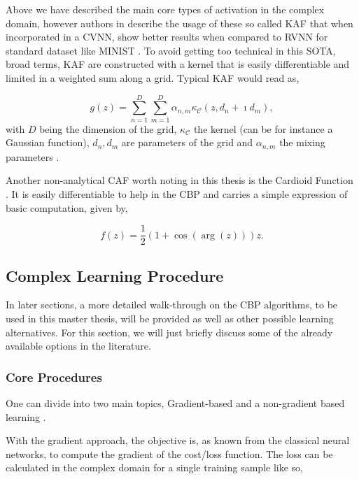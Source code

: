 Above we have described the main core types of activation in the complex domain, however authors in \parencite{scardapane2020newactfuncs} describe the usage of these so called \gls{KAF} that when incorporated in a \gls{CVNN}, show better  results when compared to \gls{RVNN} for standard dataset like MINIST \parencite{scardapane2020newactfuncs, lecun1998mnist}. To avoid getting too technical in this \gls{SOTA}, broad terms, \gls{KAF} are constructed with a kernel that is easily differentiable and limited in a weighted sum along a grid. Typical  \gls{KAF} would read as,

\begin{equation}
	g(z) = \sum_{n=1}^{D}\sum_{m=1}^{D} \alpha_{n,m} \kappa_{\mathcal{C}}\left( z, d_n + \imath d_m \right),
\end{equation}
with $D$ being the dimension of the grid, $\kappa_{\mathcal{C}}$ the kernel (can be for instance a Gaussian function), ${d_n, d_m}$ are parameters of the grid and $\alpha_{n,m}$ the mixing parameters \parencite{hofmann2008kernel, liu2011kernel}.

Another non-analytical \gls{CAF} worth noting in this thesis is the Cardioid Function \parencite{virtue2017mribettercvnn}. It is easily differentiable to help in the \gls{CBP} and carries a simple expression of basic computation, given by,

\begin{equation}
	f(z) = \dfrac{1}{2} \left( 1 + \cos(\arg(z)) \right) z. 
\end{equation}

\subsection{Complex Learning Procedure}

In later sections, a more detailed walk-through on the \gls{CBP} algorithms, to be used in this master thesis, will be provided as well as other possible learning alternatives. For this section, we will just briefly discuss some of the already available options in the literature.

\subsubsection{Core Procedures}

One can divide into two main topics, Gradient-based and a non-gradient based learning \parencite{bassey2021survey, abdalla2023newtheory}.

With the gradient approach, the objective is, as known from the classical neural networks, to compute the gradient of the cost/loss function. The loss can be calculated in the complex domain for a single training sample like so,

